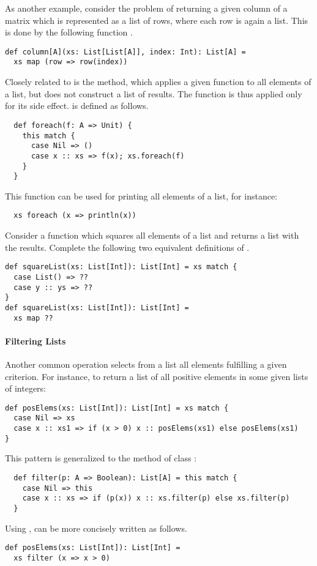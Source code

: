 As another example, consider the problem of returning a given column
of a matrix which is represented as a list of rows, where each row is
again a list. This is done by the following function .

\begin{lstlisting}
def column[A](xs: List[List[A]], index: Int): List[A] =
  xs map (row => row(index))
\end{lstlisting}

Closely related to  is the  method, which
applies a given function to all elements of a list, but does not
construct a list of results. The function is thus applied only for its
side effect.  is defined as follows.
\begin{lstlisting}
  def foreach(f: A => Unit) {
    this match {
      case Nil => ()
      case x :: xs => f(x); xs.foreach(f)
    }
  }
\end{lstlisting}
This function can be used for printing all elements of a list, for instance:
\begin{lstlisting}
  xs foreach (x => println(x))
\end{lstlisting} 

\begin{exercise} Consider a function which squares all elements of a list and
returns a list with the results. Complete the following two equivalent
definitions of .

\begin{lstlisting}
def squareList(xs: List[Int]): List[Int] = xs match {
  case List() => ??
  case y :: ys => ??
}
def squareList(xs: List[Int]): List[Int] =
  xs map ??
\end{lstlisting}
\end{exercise}

\paragraph{Filtering Lists}
Another common operation selects from a list all elements fulfilling a
given criterion. For instance, to return a list of all positive
elements in some given lists of integers:
\begin{lstlisting}
def posElems(xs: List[Int]): List[Int] = xs match {
  case Nil => xs
  case x :: xs1 => if (x > 0) x :: posElems(xs1) else posElems(xs1)
}
\end{lstlisting}
This pattern is generalized to the  method of class :
\begin{lstlisting}
  def filter(p: A => Boolean): List[A] = this match {
    case Nil => this
    case x :: xs => if (p(x)) x :: xs.filter(p) else xs.filter(p)
  }
\end{lstlisting}
Using ,  can be more concisely written as
follows.
\begin{lstlisting}
def posElems(xs: List[Int]): List[Int] =
  xs filter (x => x > 0)
\end{lstlisting}


